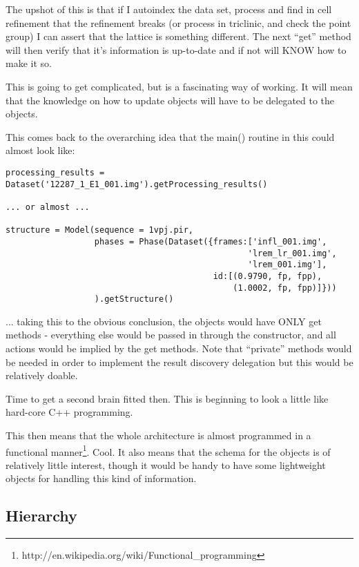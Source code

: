 \documentclass[a4paper, 11pt]{article}
\begin{document}
The upshot of this is that if I autoindex the data set, process and find in 
cell refinement that the refinement breaks (or process in triclinic, and
check the point group) I can assert that the lattice is something different.
The next ``get'' method will then verify that it's information is up-to-date
and if not will KNOW how to make it so.

This is going to get complicated, but is a fascinating way of working. 
It will mean that the knowledge on how to update objects will have to be
delegated to the objects.

This comes back to the overarching idea that the main() routine in this 
could almost look like:

{
\tiny
\begin{verbatim}
processing_results = Dataset('12287_1_E1_001.img').getProcessing_results()

... or almost ...

structure = Model(sequence = 1vpj.pir,
                  phases = Phase(Dataset({frames:['infl_001.img', 
                                                 'lrem_lr_001.img',
                                                 'lrem_001.img'],
                                          id:[(0.9790, fp, fpp),
                                              (1.0002, fp, fpp)]}))
                  ).getStructure()
\end{verbatim}
}

... taking this to the obvious conclusion, the objects would have ONLY get 
methods - everything else would be passed in through the constructor, and all
actions would be implied by the get methods. Note that ``private'' methods 
would be needed in order to implement the result discovery delegation but
this would be relatively doable.

Time to get a second brain fitted then. This is beginning to look a little 
like hard-core C++ programming.

This then means that the whole architecture is almost programmed in a 
functional 
manner\footnote{http://en.wikipedia.org/wiki/Functional\_programming}. 
Cool. It also means that the schema for the objects is
of relatively little interest, though it would be handy to have some 
lightweight objects for handling this kind of information.

\subsection{Hierarchy}
\end{document}
